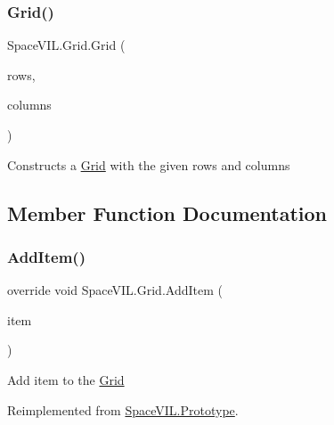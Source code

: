 \subsubsection{\texorpdfstring{Grid()}{Grid()}}
{\footnotesize\ttfamily Space\+V\+I\+L.\+Grid.\+Grid (\begin{DoxyParamCaption}\item[{int}]{rows,  }\item[{int}]{columns }\end{DoxyParamCaption})}



Constructs a \mbox{\hyperlink{class_space_v_i_l_1_1_grid}{Grid}} with the given rows and columns 



\subsection{Member Function Documentation}
\mbox{\label{class_space_v_i_l_1_1_grid_a5b339dbf56352afd9546f66ef4c02416}} 
\subsubsection{\texorpdfstring{Add\+Item()}{AddItem()}}
{\footnotesize\ttfamily override void Space\+V\+I\+L.\+Grid.\+Add\+Item (\begin{DoxyParamCaption}\item[{\mbox{\hyperlink{interface_space_v_i_l_1_1_core_1_1_i_base_item}{I\+Base\+Item}}}]{item }\end{DoxyParamCaption})\hspace{0.3cm}{\ttfamily [virtual]}}



Add item to the \mbox{\hyperlink{class_space_v_i_l_1_1_grid}{Grid}} 



Reimplemented from \mbox{\hyperlink{class_space_v_i_l_1_1_prototype}{Space\+V\+I\+L.\+Prototype}}.

\mbox{\label{class_space_v_i_l_1_1_grid_ad6866d757055ed488fac7ccceb62031c}} 
